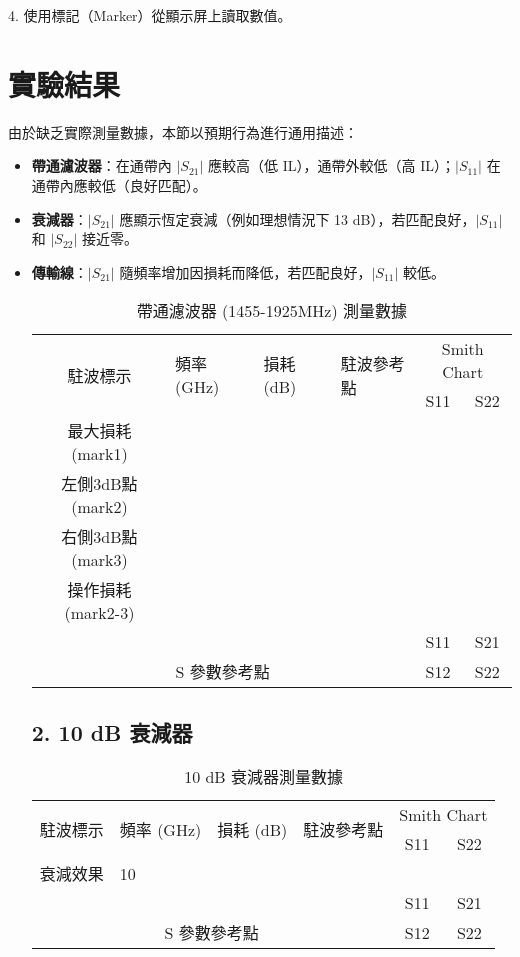 \documentclass[ paper=a4paper, 12pt]{article}
\begin{document}
4. 使用標記（Marker）從顯示屏上讀取數值。

\section{實驗結果}
由於缺乏實際測量數據，本節以預期行為進行通用描述：
\begin{itemize}
\item \textbf{帶通濾波器}：在通帶內 \(|S_{21}|\) 應較高（低 IL），通帶外較低（高 IL）；\(|S_{11}|\) 在通帶內應較低（良好匹配）。
\item \textbf{衰減器}：\(|S_{21}|\) 應顯示恆定衰減（例如理想情況下 13 dB），若匹配良好，\(|S_{11}|\) 和 \(|S_{22}|\) 接近零。
\item \textbf{傳輸線}：\(|S_{21}|\) 隨頻率增加因損耗而降低，若匹配良好，\(|S_{11}|\) 較低。
\begin{table}[ht]
\centering
\begin{tabular}{|c|l|l|l|c|c|}
\hline
\multirow{2}{*}{駐波標示} & \multirow{2}{*}{頻率 (GHz)} & \multirow{2}{*}{損耗 (dB)} & \multirow{2}{*}{駐波參考點} & \multicolumn{2}{c|}{Smith Chart} \\ \cline{5-6}
& & & & S11 & S22 \\ \hline
最大損耗 (mark1) & & & & & \\ \hline
左側3dB點 (mark2) & & & & & \\ \hline
右側3dB點 (mark3) & & & & & \\ \hline
操作損耗 (mark2-3) & & & & & \\ \hline
\multicolumn{4}{|c|}{} & S11 & S21 \\ \hline
\multicolumn{4}{|c|}{S 參數參考點} & S12 & S22 \\ \hline
\end{tabular}
\caption{帶通濾波器 (1455-1925MHz) 測量數據}
\end{table}

\subsection*{2. 10 dB 衰減器}
\begin{table}[h!]
\centering
\begin{tabular}{|c|l|l|l|c|c|}
\hline
\multirow{2}{*}{駐波標示} & \multirow{2}{*}{頻率 (GHz)} & \multirow{2}{*}{損耗 (dB)} & \multirow{2}{*}{駐波參考點} & \multicolumn{2}{c|}{Smith Chart} \\ \cline{5-6}
& & & & S11 & S22 \\ \hline
衰減效果 & 10 & & & & \\ \hline
\multicolumn{4}{|c|}{} & S11 & S21 \\ \hline
\multicolumn{4}{|c|}{S 參數參考點} & S12 & S22 \\ \hline
\end{tabular}
\caption{10 dB 衰減器測量數據}
\end{table}
\end{itemize}
\end{document}
